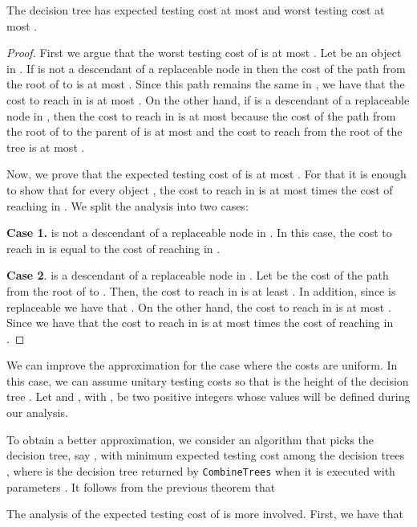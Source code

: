 \documentclass{llncs}
\begin{document}
\normalsize


\begin{theorem}
The decision tree  has expected testing cost at most  and worst testing cost at most .
\end{theorem}
\begin{proof}
First we argue that the worst testing cost of  is at most
.
Let  be an object in .
If  is not a descendant of a replaceable node in  then
the cost of the path from the root of  to  is at most .
Since this path remains the same in  ,
we have that the cost to reach  in  is at most .
On the other hand, if  is  a descendant of a replaceable node  in , then
the cost to reach  in  is at most  because the cost of the path from the root of   to the parent of  is at 
 most  and the cost to reach  from the root of the tree  is at most
.

Now, we prove that the expected testing
 cost of  is at most
.
For that it is enough 
to show that for every object , the cost
to reach  in  is at most  times the cost of
reaching  in .
We split the analysis into two cases:

{\bf Case 1.}
  is not a descendant of a replaceable node in . In this case, the cost
to reach  in   is equal to the cost of reaching  in .

\medskip
{\bf Case 2}.   is  a descendant of a replaceable node  in .
Let  be the cost of the path from the root of  to  . 
Then, the cost  to reach  in  
is at least .   In addition, since  is replaceable we have that
 .
On the other hand, the cost to reach  in 
 is at most . 
Since  we have that the cost
to reach  in  is at most  times the cost of
reaching  in .
\end{proof}


We can improve the approximation for 
the case where the costs are uniform.
In this case, we can assume unitary testing costs so that   is the height
of the decision tree .
Let   and , with , be two positive integers whose values  will be defined during our analysis.

To obtain a better approximation,  we consider an algorithm that picks the decision tree, say  , with minimum expected testing cost among
the decision trees , where  is the decision tree returned
by {\tt CombineTrees} when it is executed
with parameters .
It follows from the previous theorem that 


The analysis of the  expected testing cost of  is more involved.
First,  we have that 
\end{document}
